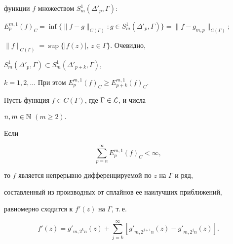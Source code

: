 функции $f$ множеством $S^1_m(\Delta'_p,\Gamma)$:


$E^{m,1}_p(f)_C=\inf\{\|f-g\|_{C(\Gamma)}:g\in S^1_m(\Delta'_p,\Gamma)


\}=\|f-g_{m,p}\|_{C(\Gamma)}$;


$\|f\|_{C(\Gamma)}=\sup\{|f(z)|,\,z\in\Gamma\}$. Очевидно,


$S^1_m(\Delta'_p,\Gamma)\subset S^1_m(\Delta'_{p+k},\Gamma)$,


$k=1,2,\dotsc$ При этом $E^{m,1}_p(f)_C\ge E^{m,1}_{p+k}(f)_C$.





\begin{thmnonum}


Пусть функция $f\in C(\Gamma)$, где $\Gamma\in\cal L$, и числа


$n,m\in\Bbb N$ $(m\ge 2)$.


Если


\begin{equation}


\sum^\infty_{p=n}E^{m,1}_p(f)_C<\infty,


\end{equation}


то $f$ является непрерывно дифференцируемой по $z$ на $\Gamma$ и ряд,


составленный из производных от сплайнов ее наилучших приближений,


равномерно сходится к $f'(z)$ на $\Gamma$, т.\,е.


\begin{equation}


f'(z)=g'_{m,2^k n}(z)+\sum^\infty_{j=k}


[g'_{m,2^{j+1}n}(z)-g'_{m,2^j n}(z)].


\end{equation}


\end{thmnonum}





